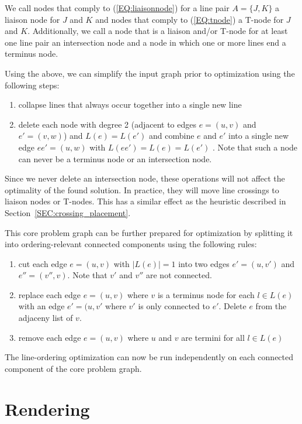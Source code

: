\documentclass{llncs}
\begin{document}
We call nodes that comply to (\ref{EQ:liaisonnode}) for a line pair $A = \{J, K\}$ a liaison node for $J$ and $K$ and nodes that comply to (\ref{EQ:tnode}) a T-node for $J$ and $K$. Additionally, we call a node that is a liaison and/or T-node for at least one line pair an intersection node and a node in which one or more lines end a terminus node.

Using the above, we can simplify the input graph prior to optimization using the following steps:
\begin{enumerate}
\item collapse lines that always occur together into a single new line
\item delete each node with degree 2 (adjacent to edges $e = (u, v)$ and $e' = (v, w)$) and $L(e) = L(e')$ and combine $e$ and $e'$ into a single new edge $ee' = (u, w)$ with $L(ee') = L(e) = L(e')$ . Note that such a node can never be a terminus node or an intersection node.
\end{enumerate}
Since we never delete an intersection node, these operations will not affect the optimality of the found solution. In practice, they will move line crossings to liaison nodes or T-nodes. This has a similar effect as the heuristic described in Section~\ref{SEC:crossing_placement}.

This core problem graph can be further prepared for optimization by splitting it into ordering-relevant connected components using the following rules:
\begin{enumerate}
	\item cut each edge $e = (u, v)$ with $|L(e)| = 1$ into two edges $e' = (u, v')$ and $e'' = (v'', v)$. Note that $v'$ and $v''$ are not connected.
	\item replace each edge $e = (u, v)$ where $v$ is a terminus node for each $l \in L(e)$ with an edge $e' = (u, v'$ where $v'$ is only connected to $e'$. Delete $e$ from the adjaceny list of $v$.
	\item remove each edge $e = (u, v)$ where $u$ and $v$ are termini for all $l \in L(e)$
\end{enumerate}
The line-ordering optimization can now be run independently on each connected component of the core problem graph.

%
\section{Rendering}\label{SEC:rendering}
%
\end{document}
